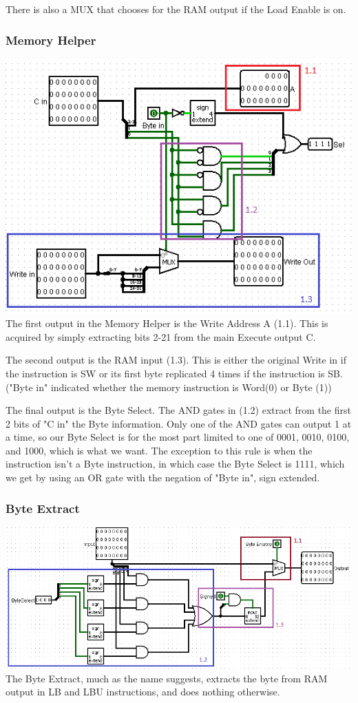 \documentclass{article}
\begin{document}
 There is also a MUX that chooses for the RAM output if the Load Enable is on.
 
\subsubsection{Memory Helper}
\includegraphics{MemHelp.png}
The first output in the Memory Helper is the Write Address A (1.1). This is acquired by simply extracting bits 2-21 from the main Execute output C. 

The second output is the RAM input (1.3). This is either the original Write in if the instruction is SW or its first byte replicated 4 times if the instruction is SB. ("Byte in" indicated whether the memory instruction is Word(0) or Byte (1)) 

The final output is the Byte Select. The AND gates in (1.2) extract from the first 2 bits of "C in" the Byte information. Only one of the AND gates can output 1 at a time, so our Byte Select is for the most part limited to one of 0001, 0010, 0100, and 1000, which is what we want. The exception to this rule is when the instruction isn't a Byte instruction, in which case the Byte Select is 1111, which we get by using an OR gate with the negation of "Byte in", sign extended. 

\subsubsection{Byte Extract}
\includegraphics{ByteExtract.png} 
 The Byte Extract, much as the name suggests, extracts the byte from RAM output in LB and LBU instructions, and does nothing otherwise.
 
\end{document}

